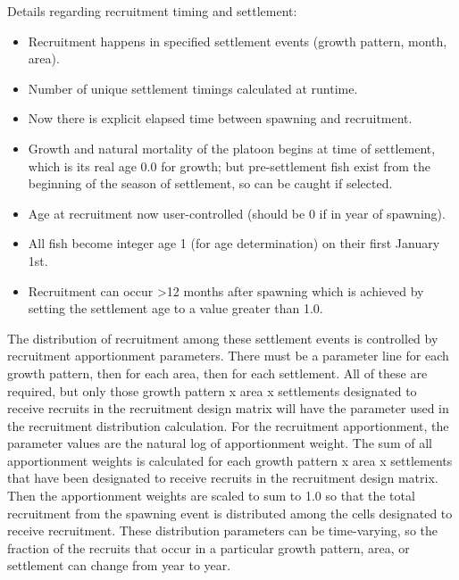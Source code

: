 Details regarding recruitment timing and settlement:
	\begin{itemize}
		\item Recruitment happens in specified settlement events (growth pattern, month, area).
		\item Number of unique settlement timings calculated at runtime.
		\item Now there is explicit elapsed time between spawning and recruitment.
		\item Growth and natural mortality of the platoon begins at time of settlement, which is its real age 0.0 for growth; but pre-settlement fish exist from the beginning of the season of settlement, so can be caught if selected.
		\item Age at recruitment now user-controlled (should be 0 if in year of spawning).
		\item All fish become integer age 1 (for age determination) on their first January 1st.
		\item Recruitment can occur >12 months after spawning which is achieved by setting the settlement age to a value greater than 1.0.		
	\end{itemize}

The distribution of recruitment among these settlement events is controlled by recruitment apportionment parameters. There must be a parameter line for each growth pattern, then for each area, then for each settlement. All of these are required, but only those growth pattern x area x settlements designated to receive recruits in the recruitment design matrix will have the parameter used in the recruitment distribution calculation. For the recruitment apportionment, the parameter values are the natural log of apportionment weight. The sum of all apportionment weights is calculated for each growth pattern x area x settlements that have been designated to receive recruits in the recruitment design matrix. Then the apportionment weights are scaled to sum to 1.0 so that the total recruitment from the spawning event is distributed among the cells designated to receive recruitment. These distribution parameters can be time-varying, so the fraction of the recruits that occur in a particular growth pattern, area, or settlement can change from year to year. 

